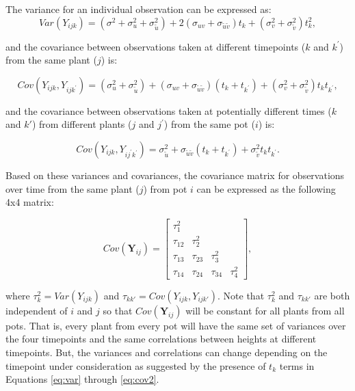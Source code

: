 \documentclass[
]{krantz}
\begin{document}
The variance for an individual observation can be expressed as:
\begin{equation}
Var(Y_{ijk}) = (\sigma^{2} + \sigma_{u}^{2} + \sigma_{\tilde{u}}^{2}) + 2(\sigma_{uv} + \sigma_{\tilde{u}\tilde{v}})t_k + (\sigma_{v}^{2} + \sigma_{\tilde{v}}^{2})t_{k}^{2},
\label{eq:var}
\end{equation}

and the covariance between observations taken at different timepoints (\(k\) and \(k^{'}\)) from the same plant (\(j\)) is:

\begin{equation}
Cov(Y_{ijk},Y_{ijk^{'}}) = (\sigma_{u}^{2} + \sigma_{\tilde{u}}^{2}) + (\sigma_{uv} + \sigma_{\tilde{u}\tilde{v}})(t_{k}+t_{k^{'}}) + (\sigma_{v}^{2} + \sigma_{\tilde{v}}^{2})t_{k}t_{k^{'}},
\label{eq:cov1}
\end{equation}

and the covariance between observations taken at potentially different times (\(k\) and \(k'\)) from different plants (\(j\) and \(j^{'}\)) from the same pot (\(i\)) is:

\begin{equation}
Cov(Y_{ijk},Y_{ij^{'}k^{'}}) = \sigma_{\tilde{u}}^{2} + \sigma_{\tilde{u}\tilde{v}}(t_{k}+t_{k^{'}}) + \sigma_{\tilde{v}}^{2}t_{k}t_{k^{'}}.
\label{eq:cov2}
\end{equation}

Based on these variances and covariances, the covariance matrix for observations over time from the same plant (\(j\)) from pot \(i\) can be expressed as the following 4x4 matrix:

\[  Cov(\textbf{Y}_{ij}) = \left[
          \begin{array}{cccc}
            \tau_{1}^{2} & & & \\
            \tau_{12} & \tau_{2}^{2} & & \\
            \tau_{13} & \tau_{23} & \tau_{3}^{2} & \\
            \tau_{14} & \tau_{24} & \tau_{34} & \tau_{4}^{2}
          \end{array} \right], \]

where \(\tau_{k}^{2}=Var(Y_{ijk})\) and \(\tau_{kk'}=Cov(Y_{ijk},Y_{ijk'})\). Note that \(\tau_{k}^{2}\) and \(\tau_{kk'}\) are both independent of \(i\) and \(j\) so that \(Cov(\textbf{Y}_{ij})\) will be constant for all plants from all pots. That is, every plant from every pot will have the same set of variances over the four timepoints and the same correlations between heights at different timepoints. But, the variances and correlations can change depending on the timepoint under consideration as suggested by the presence of \(t_k\) terms in Equations \eqref{eq:var} through \eqref{eq:cov2}.
\end{document}

